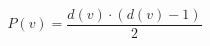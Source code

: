 \documentclass[12pt]{article}
\begin{document}
\[
P(v) =\frac
    {d\left(v\right) \cdot \left(d\left(v\right) - 1\right)}
    {2}
\]
\end{document}
